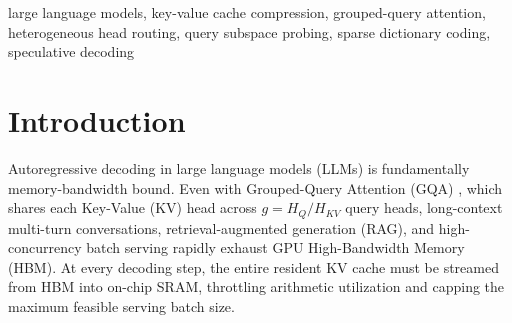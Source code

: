 \documentclass[conference]{IEEEtran}
\begin{document}
\begin{IEEEkeywords}
large language models, key-value cache compression, grouped-query attention, heterogeneous head routing, query subspace probing, sparse dictionary coding, speculative decoding
\end{IEEEkeywords}

\section{Introduction}
Autoregressive decoding in large language models (LLMs) is fundamentally memory-bandwidth bound. Even with Grouped-Query Attention (GQA) \cite{b1}, which shares each Key-Value (KV) head across $g = H_Q / H_{KV}$ query heads, long-context multi-turn conversations, retrieval-augmented generation (RAG), and high-concurrency batch serving rapidly exhaust GPU High-Bandwidth Memory (HBM). At every decoding step, the entire resident KV cache must be streamed from HBM into on-chip SRAM, throttling arithmetic utilization and capping the maximum feasible serving batch size.
\end{document}
